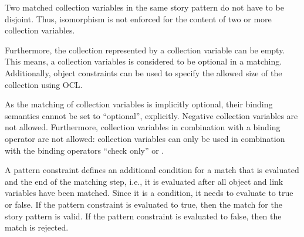 {Two matched collection variables in the same story pattern do not have to be disjoint.
Thus, isomorphism is not enforced for the content of two or more collection variables.

Furthermore, the collection represented by a collection variable can be empty.
This means, a collection variables is considered to be optional in a matching.
Additionally, object constraints can be used to specify the allowed size of
the collection using OCL.

As the matching of collection variables is implicitly optional, their binding semantics cannot be set to ``optional'', explicitly.
Negative collection variables are not allowed.
Furthermore, collection variables in combination with a \create binding operator
are not allowed: collection variables can only be used in combination with the
binding operators ``check only'' or \destroy.






}%



A pattern constraint defines an additional condition for a match that is evaluated and the end of the matching step, i.e., it is evaluated after all object and link variables have been matched. Since it is a condition, it needs to evaluate to true or false. If the pattern constraint is evaluated to true, then the match for the story pattern is valid. If the pattern constraint is evaluated to false, then the match is rejected.

